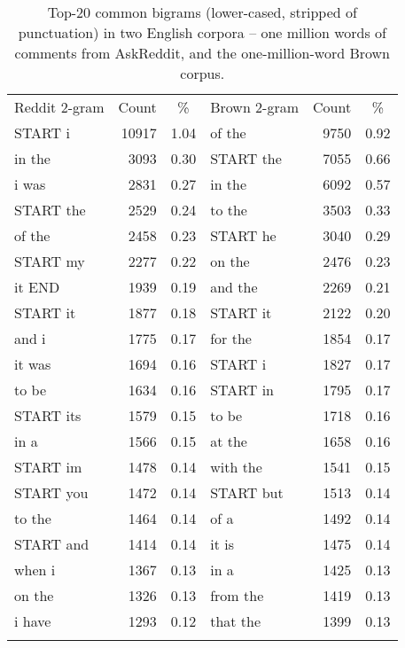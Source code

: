 \begin{table}
\begin{tabular}{lrc  lrc}
\lsptoprule
{Reddit 2-gram} & {Count} & {\%} & {Brown 2-gram} & {Count} & {\%}  \\ \cmidrule(r){1-3} \cmidrule(l){4-6}
START i & 10917 & 1.04 & of the & 9750 & 0.92 \\
in the & 3093 & 0.30 & START the & 7055 & 0.66 \\
i was & 2831 & 0.27 & in the & 6092 & 0.57 \\
START the & 2529 & 0.24 & to the & 3503 & 0.33 \\
of the & 2458 & 0.23 & START he & 3040 & 0.29 \\
START my & 2277 & 0.22 & on the & 2476 & 0.23 \\
it END & 1939 & 0.19 & and the & 2269 & 0.21 \\
START it & 1877 & 0.18 & START it & 2122 & 0.20 \\
and i & 1775 & 0.17 & for the & 1854 & 0.17 \\
it was & 1694 & 0.16 & START i & 1827 & 0.17 \\
to be & 1634 & 0.16 & START in & 1795 & 0.17 \\
START its & 1579 & 0.15 & to be & 1718 & 0.16 \\
in a & 1566 & 0.15 & at the & 1658 & 0.16 \\
START im & 1478 & 0.14 & with the & 1541 & 0.15 \\
START you & 1472 & 0.14 & START but & 1513 & 0.14 \\
to the & 1464 & 0.14 & of a & 1492 & 0.14 \\
START and & 1414 & 0.14 & it is & 1475 & 0.14 \\
when i & 1367 & 0.13 & in a & 1425 & 0.13 \\
on the & 1326 & 0.13 & from the & 1419 & 0.13 \\
i have & 1293 & 0.12 & that the & 1399 & 0.13 \\
\lspbottomrule
\end{tabular}
\caption{Top-20 common bigrams (lower-cased, stripped of punctuation) in two English corpora -- one million words of comments from AskReddit, and the one-million-word Brown corpus.}
\label{fig:2grams}
\end{table}



